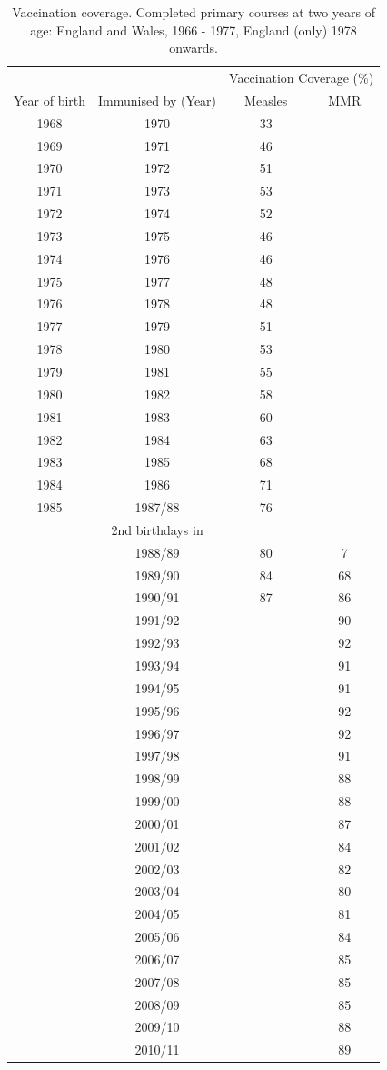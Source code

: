\documentclass[a4paper,11pt] {scrartcl}
\begin{document}
\begin{table} [hp]
\centering
\begin{tabular}{c c c c}
\toprule
& & \multicolumn{2}{c}{Vaccination Coverage (\%)}\\
Year of birth & Immunised by (Year) & Measles & MMR\\ 
\midrule
1968 & 1970 & 33 & \\ 
1969 & 1971 & 46 & \\ 
1970 & 1972 & 51 & \\ 
1971 & 1973 & 53 & \\ 
1972 & 1974 & 52 & \\ 
1973 & 1975 & 46 & \\ 
1974 & 1976 & 46 & \\ 
1975 & 1977 & 48 & \\ 
1976 & 1978 & 48 & \\ 
1977 & 1979 & 51 & \\ 
1978 & 1980 & 53 & \\ 
1979 & 1981 & 55 & \\ 
1980 & 1982 & 58 & \\ 
1981 & 1983 & 60 & \\ 
1982 & 1984 & 63 & \\ 
1983 & 1985 & 68 & \\ 
1984 & 1986 & 71 & \\ 
1985 & 1987/88 & 76 & \\ 
\midrule
& 2nd birthdays in &  & \\ 
\midrule
&1988/89   & 80 & 7\\ 
&1989/90   & 84 & 68\\ 
&1990/91   & 87 & 86\\ 
&1991/92   &  & 90\\ 
&1992/93   &  & 92\\ 
&1993/94   &  & 91\\ 
&1994/95   &  & 91\\ 
&1995/96   &  & 92\\ 
&1996/97   &  & 92\\ 
&1997/98   &  & 91\\ 
&1998/99   &  & 88\\ 
&1999/00   &  & 88\\ 
&2000/01   &  & 87\\ 
&2001/02   &  & 84\\ 
&2002/03   &  & 82\\ 
&2003/04   &  & 80\\ 
&2004/05  &  & 81\\ 
&2005/06   &  & 84\\ 
&2006/07   &  & 85\\ 
&2007/08   &  & 85\\ 
&2008/09   &  & 85\\ 
&2009/10    &  & 88\\ 
&2010/11    &  & 89\\
\bottomrule
\end{tabular}
\caption{Vaccination coverage. Completed primary courses at two years of age: England and Wales, 1966 - 1977, England (only) 1978 onwards\cite{hpaimmunistationcoverage}.}
\label{tab:vaccinationcoverage}
\end{table}
\end{document}
